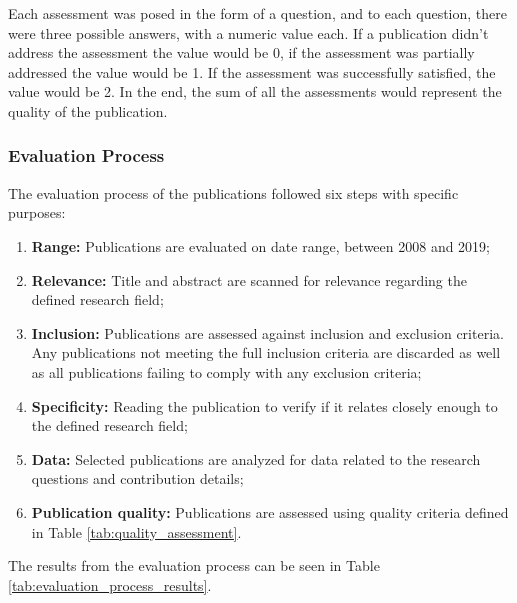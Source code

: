 Each assessment was posed in the form of a question, and to each question, there were three possible answers, with a numeric value each. If a publication didn't address the assessment the value would be 0, if the assessment was partially addressed the value would be 1. If the assessment was successfully satisfied, the value would be 2. In the end, the sum of all the assessments would represent the quality of the publication.

\subsubsection{Evaluation Process}\label{sec:evaluation_process}

The evaluation process of the publications followed six steps with specific purposes:

\begin{enumerate}
    \item \textbf{Range:} Publications are evaluated on date range, between 2008 and 2019;
    \item \textbf{Relevance:} Title and abstract are scanned for relevance regarding the defined research field;
    \item \textbf{Inclusion:} Publications are assessed against inclusion and exclusion criteria. Any publications not meeting the full inclusion criteria are discarded as well as all publications failing to comply with any exclusion criteria;
    \item \textbf{Specificity:} Reading the publication to verify if it relates closely enough to the defined research field; 
    \item \textbf{Data:} Selected publications are analyzed for data related to the research questions and contribution details;
    \item \textbf{Publication quality:} Publications are assessed using quality criteria defined in Table \ref{tab:quality_assessment}.
\end{enumerate}{}

The results from the evaluation process can be seen in Table \ref{tab:evaluation_process_results}.

\captionsetup{belowskip=12pt,aboveskip=4pt}
\begin{table}[ht]
    \centering
    \caption{Publications per step}
    \label{tab:evaluation_process_results}
\end{table}{}

